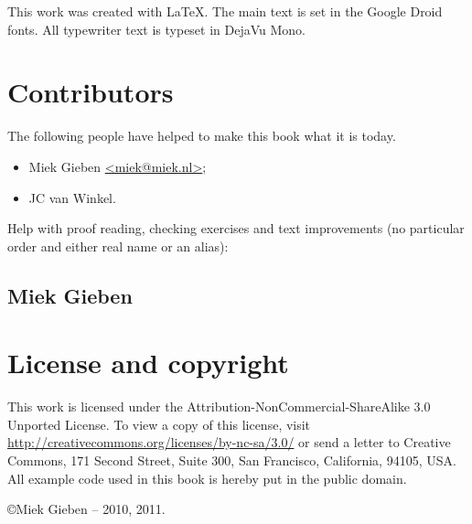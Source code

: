 \noindent{}This work was created with \LaTeX. The main text is set in
the Google Droid fonts. All typewriter text is typeset in DejaVu Mono.

\section{Contributors}
The following people have helped to make this book what it is today.
\begin{itemize}
\item{Miek Gieben \qquad\url{<miek@miek.nl>}};
\item{JC van Winkel}.
\end{itemize}

Help with proof reading, checking exercises and text improvements (no
particular order and either real name or an alias):


\subsection{Miek Gieben}


\section{License and copyright}
This work is licensed under the Attribution-NonCommercial-ShareAlike 3.0 Unported License. To
view a copy of this license, visit \url{http://creativecommons.org/licenses/by-nc-sa/3.0/}
or send a letter to Creative Commons, 171 Second Street, Suite 300, San
Francisco, California, 94105, USA.\newline
All example code used in this book is hereby put in the public domain.

\copyright Miek Gieben -- 2010, 2011.
